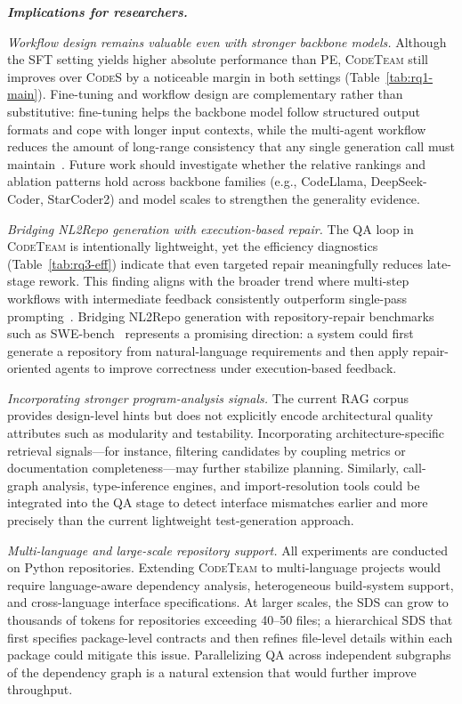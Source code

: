 \documentclass[format=acmsmall, review=false, screen=true]{acmart}
\newcommand{\fakesection}[2][1em]{\vspace{#1}\noindent\textit{\textbf{#2}}}
\newcommand{\tool}{\textsc{CodeTeam}\xspace}
\newcommand{\codes}{\textsc{CodeS}\xspace}
\begin{document}
\fakesection{Implications for researchers.}

\emph{Workflow design remains valuable even with stronger backbone models.}
Although the SFT setting yields higher absolute performance than PE, \tool still improves over \codes by a noticeable margin in both settings (Table~\ref{tab:rq1-main}).
Fine-tuning and workflow design are complementary rather than substitutive: fine-tuning helps the backbone model follow structured output formats and cope with longer input contexts, while the multi-agent workflow reduces the amount of long-range consistency that any single generation call must maintain~\cite{Zan2025CodeS,Chen2023LongLoRA}.
Future work should investigate whether the relative rankings and ablation patterns hold across backbone families (e.g., CodeLlama, DeepSeek-Coder, StarCoder2) and model scales to strengthen the generality evidence.

\emph{Bridging NL2Repo generation with execution-based repair.}
The QA loop in \tool is intentionally lightweight, yet the efficiency diagnostics (Table~\ref{tab:rq3-eff}) indicate that even targeted repair meaningfully reduces late-stage rework.
This finding aligns with the broader trend where multi-step workflows with intermediate feedback consistently outperform single-pass prompting~\cite{Ridnik2024AlphaCodium}.
Bridging NL2Repo generation with repository-repair benchmarks such as SWE-bench~\cite{Jimenez2023SWEBench,Yang2024SWEagent} represents a promising direction: a system could first generate a repository from natural-language requirements and then apply repair-oriented agents to improve correctness under execution-based feedback.

\emph{Incorporating stronger program-analysis signals.}
The current RAG corpus provides design-level hints but does not explicitly encode architectural quality attributes such as modularity and testability.
Incorporating architecture-specific retrieval signals---for instance, filtering candidates by coupling metrics or documentation completeness---may further stabilize planning.
Similarly, call-graph analysis, type-inference engines, and import-resolution tools could be integrated into the QA stage to detect interface mismatches earlier and more precisely than the current lightweight test-generation approach.

\emph{Multi-language and large-scale repository support.}
All experiments are conducted on Python repositories.
Extending \tool to multi-language projects would require language-aware dependency analysis, heterogeneous build-system support, and cross-language interface specifications.
At larger scales, the SDS can grow to thousands of tokens for repositories exceeding 40--50 files; a hierarchical SDS that first specifies package-level contracts and then refines file-level details within each package could mitigate this issue.
Parallelizing QA across independent subgraphs of the dependency graph is a natural extension that would further improve throughput.
\end{document}
